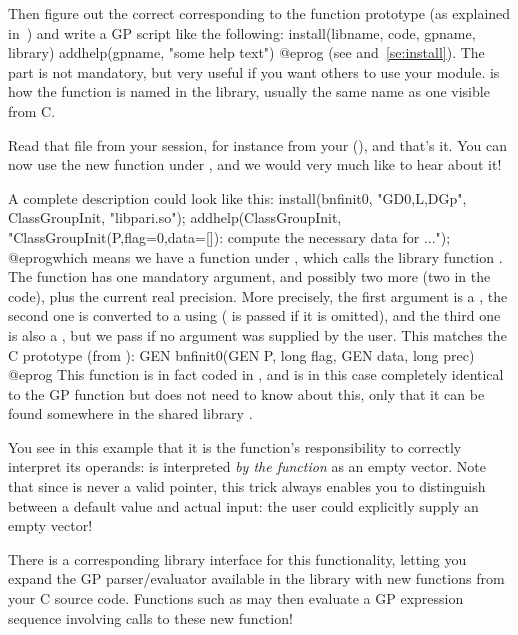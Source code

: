 Then figure out the correct  corresponding to the function
prototype (as explained in~) and write a GP script
like the following:
\bprog
install(libname, code, gpname, library)
addhelp(gpname, "some help text")
@eprog
\noindent(see  and~\ref{se:install}). The 
part is not mandatory, but very useful if you want others to use your
module.  is how the function is named in the library,
usually the same name as one visible from C.

Read that file from your  session, for instance from your
 (), and that's it. You
can now use the new function  under , and we would very
much like to hear about it! \smallskip

A complete description could look like this:
\bprog
{
  install(bnfinit0, "GD0,L,DGp", ClassGroupInit, "libpari.so");
  addhelp(ClassGroupInit, "ClassGroupInit(P,{flag=0},{data=[]}):
    compute the necessary data for ...");
}
@eprog\noindent which means we have a function  under
, which calls the library function  . The function has
one mandatory argument, and possibly two more (two  in the code),
plus the current real precision. More precisely, the first argument is a
, the second one is converted to a  using 
( is passed if it is omitted), and the third one is also a ,
but we pass  if no argument was supplied by the user. This matches
the C prototype (from ):
%
\bprog
  GEN bnfinit0(GEN P, long flag, GEN data, long prec)
@eprog\noindent
This function is in fact coded in , and is in this case
completely identical to the GP function  but  does not
need to know about this, only that it can be found somewhere in the shared
library .

 You see in this example that it is the
function's responsibility to correctly interpret its operands:  is interpreted \emph{by the function} as an empty vector. Note that
since  is never a valid  pointer, this trick always
enables you to distinguish between a default value and actual input: the
user could explicitly supply an empty vector!


There is a corresponding library interface for this 
functionality, letting you expand the GP parser/evaluator available in the
library with new functions from your C source code. Functions such as
 may then evaluate a GP expression sequence involving calls
to these new function!


